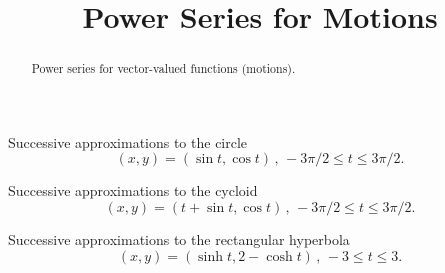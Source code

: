 \documentclass{ximera}
\title{Power Series for Motions}
\begin{document}
\begin{abstract}
Power series for vector-valued functions (motions).
\end{abstract}
\maketitle




\begin{exploration}
Successive approximations to the circle
\[
    (x,y) = (\sin t, \cos t) \, , \, -3\pi/2 \leq t \leq 3\pi/2 .
\]


 
\begin{onlineOnly}
    \begin{center}
\end{center}
\end{onlineOnly}
\end{exploration}






\begin{exploration}
Successive approximations to the cycloid
\[
    (x,y) = (t +\sin t, \cos t) \, , \, -3\pi/2 \leq t \leq 3\pi/2 .
\]


 
\begin{onlineOnly}
    \begin{center}
\end{center}
\end{onlineOnly}
\end{exploration}



\begin{exploration}
Successive approximations to the rectangular hyperbola
\[
    (x,y) = (\sinh t, 2-\cosh t) \, , \, -3 \leq t \leq 3 .
\]


 
\begin{onlineOnly}
    \begin{center}
\end{center}
\end{onlineOnly}
\end{exploration}
\end{document}

